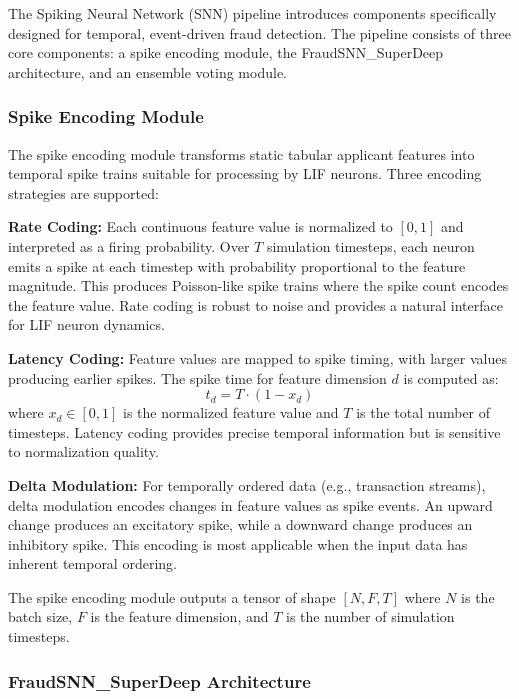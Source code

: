 The Spiking Neural Network (SNN) pipeline introduces components specifically designed for temporal, event-driven fraud detection. The pipeline consists of three core components: a spike encoding module, the FraudSNN\_SuperDeep architecture, and an ensemble voting module.

\subsubsection{Spike Encoding Module}

The spike encoding module transforms static tabular applicant features into temporal spike trains suitable for processing by LIF neurons. Three encoding strategies are supported:

\textbf{Rate Coding:} Each continuous feature value is normalized to $[0, 1]$ and interpreted as a firing probability. Over $T$ simulation timesteps, each neuron emits a spike at each timestep with probability proportional to the feature magnitude. This produces Poisson-like spike trains where the spike count encodes the feature value. Rate coding is robust to noise and provides a natural interface for LIF neuron dynamics.

\textbf{Latency Coding:} Feature values are mapped to spike timing, with larger values producing earlier spikes. The spike time for feature dimension $d$ is computed as:
\begin{equation}
t_d = T \cdot (1 - x_d)
\label{eq:latency-coding}
\end{equation}
where $x_d \in [0, 1]$ is the normalized feature value and $T$ is the total number of timesteps. Latency coding provides precise temporal information but is sensitive to normalization quality.

\textbf{Delta Modulation:} For temporally ordered data (e.g., transaction streams), delta modulation encodes changes in feature values as spike events. An upward change produces an excitatory spike, while a downward change produces an inhibitory spike. This encoding is most applicable when the input data has inherent temporal ordering.

The spike encoding module outputs a tensor of shape $[N, F, T]$ where $N$ is the batch size, $F$ is the feature dimension, and $T$ is the number of simulation timesteps.

\subsubsection{FraudSNN\_SuperDeep Architecture}

